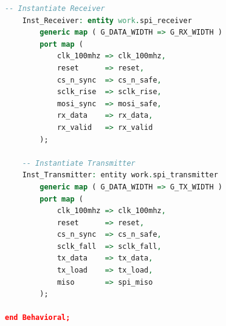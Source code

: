 \begin{lstlisting}[language=VHDL]
    -- Instantiate Receiver
    Inst_Receiver: entity work.spi_receiver
        generic map ( G_DATA_WIDTH => G_RX_WIDTH )
        port map (
            clk_100mhz => clk_100mhz,
            reset      => reset,
            cs_n_sync  => cs_n_safe,
            sclk_rise  => sclk_rise,
            mosi_sync  => mosi_safe,
            rx_data    => rx_data,
            rx_valid   => rx_valid
        );

    -- Instantiate Transmitter
    Inst_Transmitter: entity work.spi_transmitter
        generic map ( G_DATA_WIDTH => G_TX_WIDTH )
        port map (
            clk_100mhz => clk_100mhz,
            reset      => reset,
            cs_n_sync  => cs_n_safe,
            sclk_fall  => sclk_fall,
            tx_data    => tx_data,
            tx_load    => tx_load,
            miso       => spi_miso
        );

end Behavioral;
\end{lstlisting}

